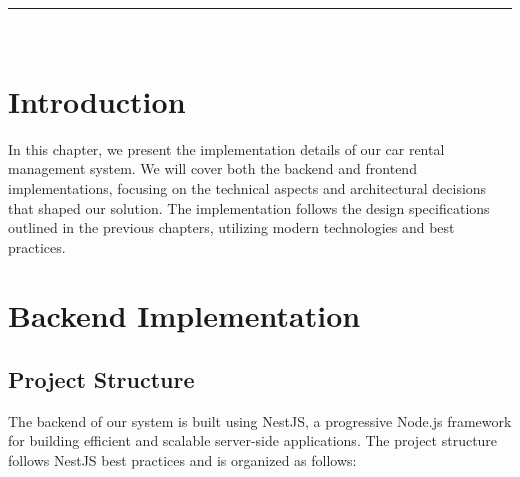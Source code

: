 \begin{center}
\rule[0.5ex]{1\columnwidth}{1pt}\\[0.5cm]
\end{center}

\newpage

\section{Introduction}
In this chapter, we present the implementation details of our car rental management system. We will cover both the backend and frontend implementations, focusing on the technical aspects and architectural decisions that shaped our solution. The implementation follows the design specifications outlined in the previous chapters, utilizing modern technologies and best practices.

\section{Backend Implementation}
\subsection{Project Structure}
The backend of our system is built using NestJS, a progressive Node.js framework for building efficient and scalable server-side applications. The project structure follows NestJS best practices and is organized as follows:

